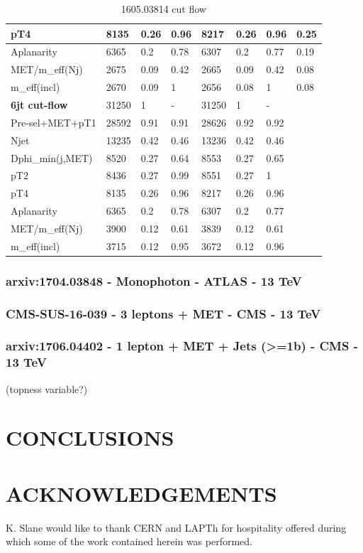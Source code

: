 \documentclass[11pt]{cernrep}
\begin{document}
\begin{table}[htbp]
\begin{tabular}{ | l || l | l | l || l | l | l || l | }
pT4               & 8135 & 0.26 & 0.96 & 8217 & 0.26 & 0.96 & 0.25  \\ \hline
Aplanarity        & 6365 & 0.2 & 0.78 & 6307 & 0.2 & 0.77 & 0.19  \\ \hline
MET/m\_eff(Nj)     & 2675 & 0.09 & 0.42 & 2665 & 0.09 & 0.42 & 0.08  \\ \hline
m\_eff(incl)       & 2670 & 0.09 & 1 & 2656 & 0.08 & 1 & 0.08  \\ \hline
\hline
{\bf 6jt cut-flow} & 31250 & 1 & - & 31250 & 1 & - & \   \\ \hline
Pre-sel+MET+pT1   & 28592 & 0.91 & 0.91 & 28626 & 0.92 & 0.92 & \   \\ \hline
Njet              & 13235 & 0.42 & 0.46 & 13236 & 0.42 & 0.46 & \   \\ \hline
Dphi\_min(j,MET)   & 8520 & 0.27 & 0.64 & 8553 & 0.27 & 0.65 & \   \\ \hline
pT2               & 8436 & 0.27 & 0.99 & 8551 & 0.27 & 1 & \   \\ \hline
pT4               & 8135 & 0.26 & 0.96 & 8217 & 0.26 & 0.96 & \   \\ \hline
Aplanarity        & 6365 & 0.2 & 0.78 & 6307 & 0.2 & 0.77 & \   \\ \hline
MET/m\_eff(Nj)     & 3900 & 0.12 & 0.61 & 3839 & 0.12 & 0.61 & \   \\ \hline
m\_eff(incl)       & 3715 & 0.12 & 0.95 & 3672 & 0.12 & 0.96 & \   \\ \hline
			
		\end{tabular}
	\caption{1605.03814 cut flow}
	\label{tab:1605.03814}
\end{table}

\subsubsection{arxiv:1704.03848 - Monophoton - ATLAS - 13 TeV}

\subsubsection{CMS-SUS-16-039 - 3 leptons + MET - CMS - 13 TeV}


\subsubsection{arxiv:1706.04402 - 1 lepton + MET + Jets (>=1b) - CMS - 13 TeV} (topness variable?)

\section*{CONCLUSIONS}


\section*{ACKNOWLEDGEMENTS}
K. Slane would like to thank CERN and LAPTh for hospitality offered
during which some of the work contained herein was performed.


\end{document}
